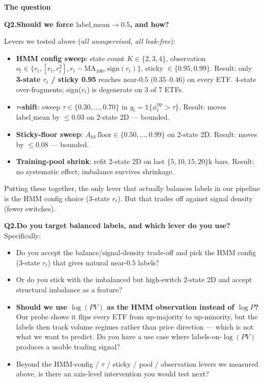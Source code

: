 \documentclass[11pt]{article}
\newcommand{\shead}[1]{\par\vspace{4pt}\noindent\textbf{\normalsize #1}\par\vspace{1pt}}
\begin{document}
\shead{The question}

\textbf{Q2.\enspace Should we force $\mathrm{label\_mean} \to 0.5$, and how?}

\smallskip
Levers we tested above (\emph{all unsupervised, all leak-free}):
\begin{itemize}
\item \textbf{HMM config sweep}: state count $K\in\{2,3,4\}$, observation $o_t\in\{r_t, [r_t,r_t^2], r_t-\mathrm{MA}_{100}, \mathrm{sign}(r_t)\}$, sticky $\in\{0.95, 0.99\}$. Result: only \textbf{3-state $r_t$ / sticky 0.95} reaches near-$0.5$ ($0.35$--$0.46$) on every ETF. 4-state over-fragments; sign($r_t$) is degenerate on 3 of 7 ETFs.
\item \textbf{$\tau$-shift}: sweep $\tau\in\{0.30,\dots,0.70\}$ in $y_t = \mathbb{1}\{\phi_t^{\mathrm{up}}{>}\tau\}$. Result: moves $\mathrm{label\_mean}$ by $\le 0.03$ on 2-state 2D --- bounded.
\item \textbf{Sticky-floor sweep}: $A_{kk}\,\text{floor}\in\{0.50,\dots,0.99\}$ on 2-state 2D. Result: moves by $\le 0.08$ --- bounded.
\item \textbf{Training-pool shrink}: refit 2-state 2D on last $\{5,10,15,20\}$k bars. Result: no systematic effect; imbalance survives shrinkage.
\end{itemize}

\smallskip
Putting these together, the only lever that actually balances labels in our pipeline is the HMM config choice (3-state $r_t$). But that trades off against signal density (fewer switches).

\textbf{Q2.\enspace Do you target balanced labels, and which lever do you use?} Specifically:
\begin{itemize}
\item Do you accept the balance/signal-density trade-off and pick the HMM config (3-state $r_t$) that gives natural near-$0.5$ labels?
\item Or do you stick with the imbalanced but high-switch 2-state 2D and accept structural imbalance as a feature?
\item \textbf{Should we use $\log(P V)$ as the HMM observation instead of $\log P$?} Our probe shows it flips every ETF from up-majority to up-minority, but the labels then track volume regimes rather than price direction --- which is not what we want to predict. Do you have a use case where labels-on-$\log(P V)$ produces a usable trading signal?
\item Beyond the HMM-config / $\tau$ / sticky / pool / observation levers we measured above, is there an axis-level intervention you would test next?
\end{itemize}
\end{document}
